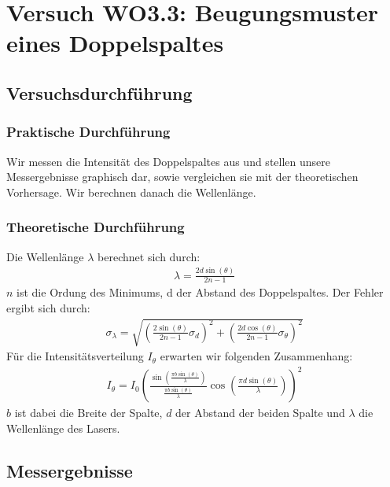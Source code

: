 \documentclass[12pt]{scrartcl}
\begin{document}
\section{Versuch WO3.3: Beugungsmuster eines Doppelspaltes}
\subsection{Versuchsdurchführung}

\subsubsection{Praktische Durchführung}
Wir messen die Intensität des Doppelspaltes aus und stellen unsere Messergebnisse graphisch dar, sowie vergleichen sie mit der theoretischen Vorhersage. Wir berechnen danach die Wellenlänge.
\subsubsection{Theoretische Durchführung}
Die Wellenlänge $\lambda$ berechnet sich durch:
\begin{align}
\lambda = \frac{2d \sin(\theta)}{2n-1}
\label{eqn:lambda_2}
\end{align}
$n$ ist die Ordung des Minimums, d der Abstand des Doppelspaltes.
Der Fehler ergibt sich durch:
\begin{align}
\sigma_\lambda = \sqrt{
\left(\frac{2 \sin(\theta)}{2n-1}\sigma_d\right)^2+
\left(\frac{2d \cos(\theta)}{2n-1}\sigma_\theta\right)^2}
\label{eqn:lambda_2_sigma}
\end{align}
Für die Intensitätsverteilung $I_\theta$ erwarten wir folgenden Zusammenhang:
\begin{align}
I_\theta = I_0\left(\frac{\sin\left(\frac{\pi b \sin(\theta)}{\lambda}\right)}{\frac{\pi b \sin(\theta)}{\lambda}}\cos\left(\frac{\pi d\sin(\theta)}{\lambda}\right)\right)^2
\label{eqn:I_theta_Doppelspalt}
\end{align}
$b$ ist dabei die Breite der Spalte, $d$ der Abstand der beiden Spalte und $\lambda$ die Wellenlänge des Lasers.

\subsection{Messergebnisse}
\end{document}
